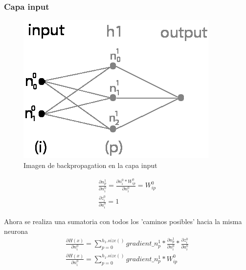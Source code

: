 \subsubsection{Capa input}

\begin{figure}[H]
	\centering
	\includegraphics[scale=0.35]{imagenes/nn_1_capa_input.jpg}  
	\caption{Imagen de backpropagation en la capa input}
	\label{fig:nn_1_capa_input}
\end{figure}

\begin{gather}
	\frac{\partial n^1_p }{\partial n^0_i } = \frac{\partial n^0_i * W^0_{ip} }{\partial n^0_i } = W^0_{ip} \\
	\frac{\partial z^0_i }{\partial a^0_i } = 1
\end{gather}

Ahora se realiza una sumatoria con todos los 'caminos posibles' hacia la misma neurona
\begin{gather}
	\frac{\partial H(x) }{\partial n^0_i } = \sum_{p=0}^{h_1.size()} gradient\_n^1_p * \frac{\partial n^1_p }{\partial n^0_i } * \frac{\partial z^0_i }{\partial a^0_i }  \\
	\frac{\partial H(x) }{\partial n^0_i } = \sum_{p=0}^{h_1.size()}  gradient\_n^1_p * W^0_{ip}
\end{gather}
